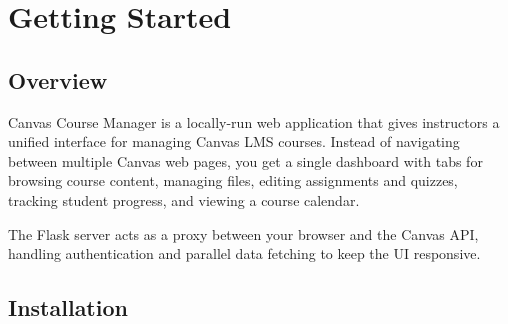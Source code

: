 \documentclass[12pt,letterpaper]{article}
\begin{document}
\tableofcontents
\newpage

\section{Getting Started}

\subsection{Overview}

Canvas Course Manager is a locally-run web application that gives instructors a unified interface for managing Canvas LMS courses. Instead of navigating between multiple Canvas web pages, you get a single dashboard with tabs for browsing course content, managing files, editing assignments and quizzes, tracking student progress, and viewing a course calendar.

\begin{center}
\end{center}

The Flask server acts as a proxy between your browser and the Canvas API, handling authentication and parallel data fetching to keep the UI responsive.

\subsection{Installation}
\end{document}
